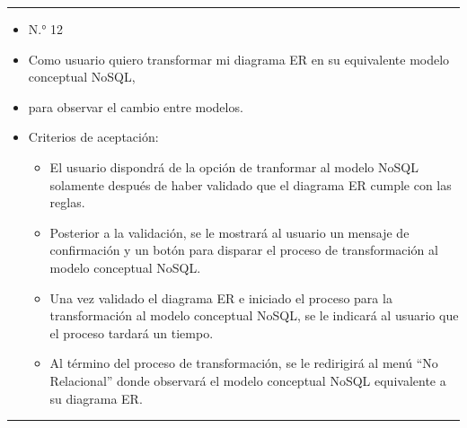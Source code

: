 \noindent\rule{\textwidth}{1pt}
\begin{itemize}
	\item N.° 12
	\item Como usuario quiero transformar mi diagrama ER en su equivalente modelo conceptual NoSQL,
	\item para observar el cambio entre modelos.
	\item Criterios de aceptación:
	\begin{itemize}
		\item El usuario dispondrá de la opción de tranformar al modelo NoSQL solamente después de haber validado que el diagrama ER cumple con las reglas.
		\item Posterior a la validación, se le mostrará al usuario un mensaje de confirmación y un botón para disparar el proceso de transformación al modelo conceptual NoSQL.
		\item Una vez validado el diagrama ER e iniciado el proceso para la transformación al modelo conceptual NoSQL, se le indicará al usuario que el proceso tardará un tiempo.
		\item Al término del proceso de transformación, se le redirigirá al menú ``No Relacional'' donde observará el modelo conceptual NoSQL equivalente a su diagrama ER.
	\end{itemize}
\end{itemize}
\noindent\rule{\textwidth}{1pt}
